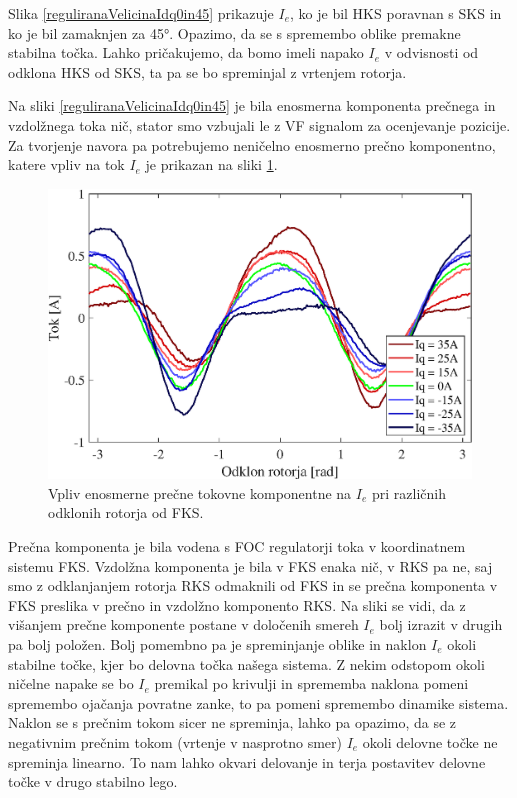 \documentclass[a4paper,twoside,openright,12pt,slovene]{book}
\begin{document}
Slika \ref{reguliranaVelicinaIdq0in45} prikazuje $I_e$, ko je bil HKS poravnan s SKS in ko je bil zamaknjen za 45°. Opazimo, da se s spremembo oblike premakne stabilna točka. Lahko pričakujemo, da bomo imeli 
napako $I_e$ v odvisnosti od odklona HKS od SKS, ta pa se bo spreminjal z vrtenjem rotorja.

Na sliki \ref{reguliranaVelicinaIdq0in45} je bila enosmerna komponenta prečnega in vzdolžnega toka nič, stator smo vzbujali le z VF signalom za ocenjevanje pozicije. Za tvorjenje navora pa potrebujemo
neničelno enosmerno prečno komponentno, katere vpliv na tok $I_e$ je prikazan na sliki \ref{reguliranaVelicinaIs}. 
\newline
\begin{figure}[!htbp]
    \centering
    \includegraphics[width=0.85\columnwidth]{Slike/reguliranaVelicinaIs.eps}
    \caption{\label{reguliranaVelicinaIs} Vpliv enosmerne prečne tokovne komponentne na $I_e$ pri različnih odklonih rotorja od FKS.}
\end{figure}

Prečna komponenta je bila vodena s FOC regulatorji toka v koordinatnem sistemu FKS.
Vzdolžna komponenta je bila v FKS enaka nič, v RKS pa ne, saj smo z odklanjanjem rotorja RKS odmaknili od FKS in se prečna komponenta v FKS preslika v prečno in vzdolžno komponento RKS. Na sliki se
vidi, da z višanjem prečne komponente postane v določenih smereh $I_e$ bolj izrazit v drugih pa bolj položen. Bolj pomembno pa je spreminjanje oblike in naklon $I_e$ okoli stabilne točke, kjer bo delovna točka našega
sistema. Z nekim odstopom okoli ničelne napake se bo $I_e$ premikal po krivulji in sprememba naklona pomeni spremembo ojačanja povratne zanke, to pa pomeni spremembo dinamike sistema. Naklon se s
prečnim tokom sicer ne spreminja, lahko pa opazimo, da se z negativnim prečnim tokom (vrtenje v nasprotno smer) $I_e$ okoli delovne točke ne spreminja linearno. To nam lahko okvari delovanje in terja
postavitev delovne točke v drugo stabilno lego.
\end{document}

